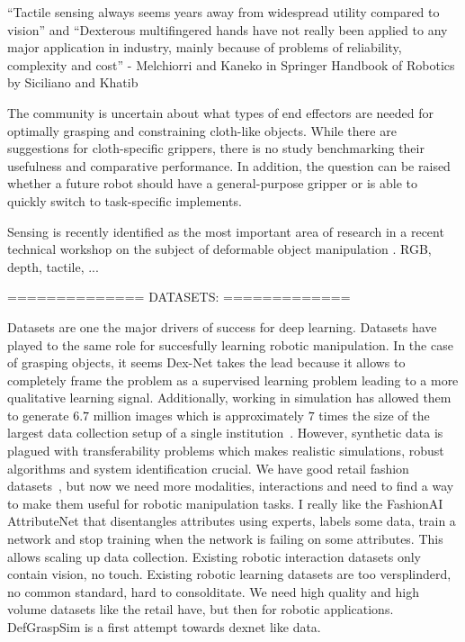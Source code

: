 \documentclass[\home/main.tex]{subfiles}
\begin{document}
“Tactile sensing always seems years away from widespread utility compared to vision” 
and
“Dexterous multifingered hands have not really been applied to any major application in industry, mainly because of problems of reliability, complexity and cost” 
  - Melchiorri and Kaneko in Springer Handbook of Robotics by Siciliano and Khatib


 The community is uncertain about what types of end effectors are needed for optimally grasping and constraining cloth-like objects. While there are suggestions for cloth-specific grippers, there is no study benchmarking their usefulness and comparative performance. In addition, the question can be raised whether a future robot should have a general-purpose gripper or is able to quickly switch to  task-specific implements.  

 Sensing is recently identified as the most important area of research in a recent technical workshop on the subject of deformable object manipulation \autocite{zhu:hal-02980281}. RGB, depth, tactile, ... 

==============
DATASETS:
=============



Datasets are one the major drivers of success for deep learning. Datasets have played to the same role for succesfully learning robotic manipulation. In the case of grasping objects, it seems Dex-Net takes the lead because it allows to completely frame the problem as a supervised learning problem leading to a more qualitative learning signal. Additionally, working in simulation has allowed them to generate $6.7$ million images which is approximately $7$ times the size of the largest data collection setup of a single institution~\autocite{Levine2016}. However, synthetic data is plagued with transferability problems which makes realistic simulations, robust algorithms and system identification crucial. 
We have good retail fashion datasets~\autocite{DeepFashion, DeepFashion2, FashionAI}, but now we need more modalities, interactions and need to find a way to make them useful for robotic manipulation tasks. 
I really like the FashionAI AttributeNet that disentangles attributes using experts, labels some data, train a network and stop training when the network is failing on some attributes. This allows scaling up data collection.
Existing robotic interaction datasets only contain vision, no touch. 
Existing robotic learning datasets are too versplinderd, no common standard, hard to consolditate. 
We need high quality and high volume datasets like the retail have, but then for robotic applications. 
DefGraspSim is a first attempt towards dexnet like data.
\end{document}

